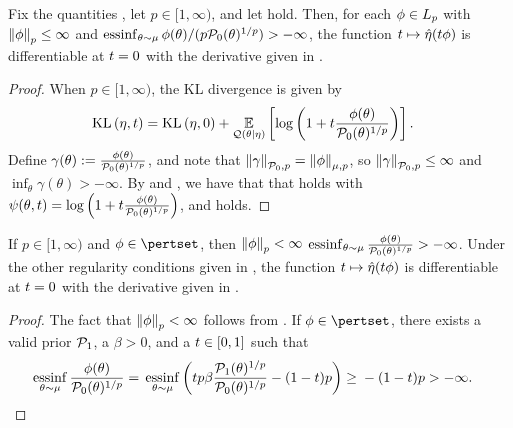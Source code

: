 \begin{thm}
%
Fix the quantities , let $p \in [1, \infty)$,
and let  hold.
Then, for each $\phi \in {L_{p}}$ with $\left\Vert\phi\right\Vert_p \le \infty$ and
$\operatorname*{\mathrm{essinf}}_{\theta\sim\mu} \phi(\theta) / (p \mathcal{P}_{0}(\theta)^{1/p})> -\infty$, the
function $t \mapsto \hat\eta(t \phi)$ is differentiable at $t = 0$ with the
derivative given in .
%
\begin{proof}
%
When $p \in [1, \infty)$, the KL divergence is given by
%
\begin{align*}
%
\KL{\eta, \t} ={}&
    \KL{\eta, 0} +
    \expect{\q(\theta \vert \eta)}
           {\log \left(1 + \t \frac{\phi(\theta)}{\pbase(\theta)^{1/p}} \right)}.
%
\end{align*}
%
Define $\gamma(\theta) := \frac{\phi(\theta)}{\mathcal{P}_{0}(\theta)^{1/p}}$, and note
that $\left\Vert\gamma\right\Vert_{\mathcal{P}_{0}, p} = \left\Vert\phi\right\Vert_{\mu,p}$, so
$\left\Vert\gamma\right\Vert_{\mathcal{P}_{0}, p} \le \infty$ and $\inf_\theta \gamma(\theta) >
-\infty$.  By  and , we have
that that  holds with $\psi(\theta, t) = \log \left(1 +
t \frac{\phi(\theta)}{\mathcal{P}_{0}(\theta)^{1/p}}\right)$, and 
holds.

%
\end{proof}
%
\end{thm}


\begin{cor}
%
If $p \in [1, \infty)$ and  $\phi \in \pertset$, then $\left\Vert\phi\right\Vert_p < \infty$
$\operatorname*{\mathrm{essinf}}_{\theta \sim \mu}\frac{\phi(\theta)}{\mathcal{P}_{0}(\theta)^{1/p}} > -\infty$.
Under the other regularity conditions given in , the
function $t \mapsto \hat\eta(t \phi)$ is differentiable at $t = 0$ with the
derivative given in .
%
\begin{proof}
%
The fact that $\left\Vert\phi\right\Vert_p < \infty$ follows from .
If $\phi \in \pertset$, there exists a valid prior $\mathcal{P}_{1}$, a $\beta > 0$,
and a $t \in [0,1]$ such that
%
\begin{align*}
%
\essinf_{\theta \sim \mu}  \frac{\phi(\theta)}{\pbase(\theta)^{1/p}}
 ={}&
 \essinf_{\theta \sim \mu} \left(
    \t p\beta \frac{\palt(\theta)^{1/p}}{\pbase(\theta)^{1/p}} - (1-\t) p
    \right)
    \ge{} - (1-\t) p > -\infty.
%
\end{align*}
%
\end{proof}
%
\end{cor}

